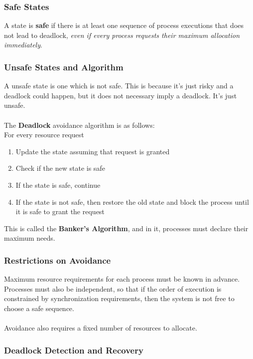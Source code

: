 \documentclass{article}
\begin{document}
\subsubsection{Safe States}

A state is \textbf{safe} if there is at least one sequence of process executions that does not lead to deadlock, \textit{even if every process requests their maximum allocation immediately}.


\subsubsection{Unsafe States and Algorithm}

A unsafe state is one which is not safe. This is because it's just risky and a deadlock could happen, but it does not necessary imply a deadlock. It's just unsafe.
\\
\\
The \textbf{Deadlock} avoidance algorithm is as follows:
\\
For every resource request
\begin{enumerate}
    \item Update the state assuming that request is granted
    \item Check if the new state is safe
    \item If the state is safe, continue
    \item If the state is not safe, then restore the old state and block the process until it is safe to grant the request
\end{enumerate}

This is called the \textbf{Banker's Algorithm}, and in it, processes must declare their maximum needs.

\subsubsection{Restrictions on Avoidance}

Maximum resource requirements for each process must be known in advance. Processes must also be independent, so that if the order of execution is constrained by synchronization requirements, then the system is not free to choose a safe sequence.
\\
\\
Avoidance also requires a fixed number of resources to allocate.

\subsubsection{Deadlock Detection and Recovery}
\end{document}
